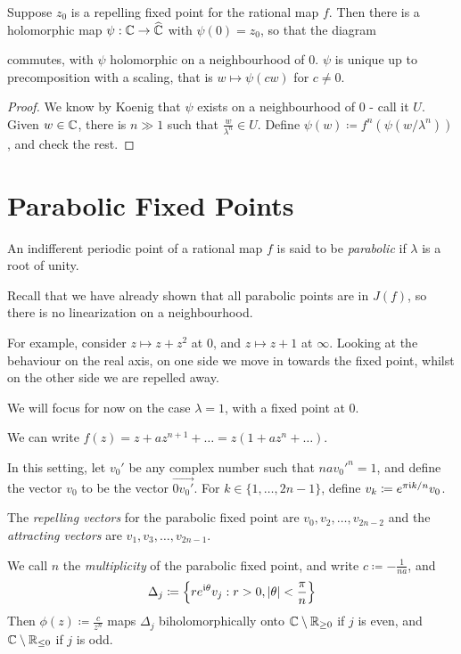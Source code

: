 \documentclass[10pt,a4paper]{article}
\begin{document}
\begin{corollary}
  Suppose $z_0$ is a repelling fixed point for the rational map $f$. Then there is a holomorphic map $\psi:\mathbb{C}\to \widehat{\mathbb{C}}$ with $\psi(0) = z_0$, so that the diagram
  \begin{center}
  \end{center}
  commutes, with $\psi$ holomorphic on a neighbourhood of $0$. $\psi$ is unique up to precomposition with a scaling, that is $w\mapsto \psi(cw)$ for $c \neq 0$.
\end{corollary}
\begin{proof}
  We know by Koenig that $\psi$ exists on a neighbourhood of $0$ - call it $U$. Given $w \in \mathbb{C}$, there is $n \gg 1$ such that $\frac{w}{\lambda^n} \in U$. Define $\psi(w) \coloneqq f^n(\psi(w/\lambda^n))$, and check the rest.
\end{proof}
\section{Parabolic Fixed Points}
An indifferent periodic point of a rational map $f$ is said to be \emph{parabolic} if $\lambda$ is a root of unity.

Recall that we have already shown that all parabolic points are in $J(f)$, so there is no linearization on a neighbourhood.

For example, consider $z\mapsto z+z^2$ at $0$, and $z\mapsto z+1$ at $\infty$. Looking at the behaviour on the real axis, on one side we move in towards the fixed point, whilst on the other side we are repelled away.

We will focus for now on the case $\lambda = 1$, with a fixed point at 0.

We can write $f(z) = z+az^{n+1} + \ldots = z(1+az^n+\ldots)$.

In this setting, let $v_0'$ be any complex number such that $nav_0'^n = 1$, and define the vector $v_0$ to be the vector $\vec{0 v_0'}$. For $k \in \{1, \ldots, 2n-1\}$, define $v_k \coloneqq e^{\pi\mathfrak{i} k/n}v_0$.

The \emph{repelling vectors} for the parabolic fixed point are $v_0, v_2, \ldots, v_{2n-2}$ and the \emph{attracting vectors} are $v_1, v_3, \ldots, v_{2n-1}$.

We call $n$ the \emph{multiplicity} of the parabolic fixed point, and write $c \coloneqq -\frac{1}{na}$, and
\[\Delta_j \coloneqq \left\{re^{\mathfrak{i}\theta}v_j : r>0, |\theta|<\frac{\pi}{n}\right\}\]
Then $\phi(z) \coloneqq \frac{c}{z^n}$ maps $\Delta_j$ biholomorphically onto $\mathbb{C} \setminus \mathbb{R}_{\geq 0}$ if $j$ is even, and $\mathbb{C}\setminus \mathbb{R}_{\leq 0}$ if $j$ is odd.
\end{document}
